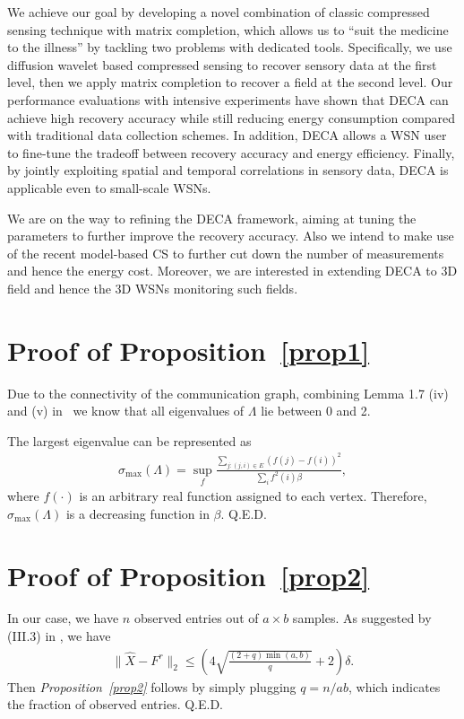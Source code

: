 \documentclass[conference]{IEEEtran}
\begin{document}
  We achieve our goal by developing a novel combination of classic compressed sensing technique with matrix completion, which allows us to ``suit the medicine to the illness'' by tackling two problems with dedicated tools. Specifically, we use diffusion wavelet based compressed sensing to recover sensory data at the first level, then we apply matrix completion to recover a field at the second level. Our performance evaluations with intensive experiments have shown that DECA can achieve high recovery accuracy while still reducing energy consumption compared with traditional data collection schemes. In addition, DECA allows a WSN user to fine-tune the tradeoff between recovery accuracy and energy efficiency. Finally, by jointly exploiting spatial and temporal correlations in sensory data, DECA is applicable even to small-scale WSNs.

  We are on the way to refining the DECA framework, aiming at tuning the parameters to further improve the recovery accuracy. Also we intend to make use of the recent model-based CS to further cut down the number of measurements and hence the energy cost. Moreover, we are interested in extending DECA to 3D field and hence the 3D WSNs monitoring such fields.





\appendices
\section{Proof of Proposition~\ref{prop1}} \label{apx:prop1}

Due to the connectivity of the communication graph, combining Lemma 1.7 (iv) and (v) in~\cite{Chung97} we know that all eigenvalues of $\Lambda$ lie between 0 and 2.

The largest eigenvalue can be represented as
\begin{eqnarray*}
\sigma_\mathrm{max}(\Lambda) = \sup_f \frac{\sum_{j:(j,i)\in E}(f(j)-f(i))^2}{\sum_i f^2(i)\beta},
\end{eqnarray*}
where $f(\cdot)$ is an arbitrary real function assigned to each vertex. Therefore, $\sigma_\mathrm{max}(\Lambda)$ is a decreasing function in $\beta$. \hfill Q.E.D.

\section{Proof of Proposition~\ref{prop2}} \label{apx:prop2}

In our case, we have $n$ observed entries out of $a\times b$ samples. As suggested by (III.3) in \cite{CandesP-ProcIEEE10}, we have
\begin{eqnarray*}
\|\hat{X} - F^r\|_2 \le \left(4\sqrt{\frac{(2+q)\min(a,b)}{q}} + 2\right)\delta.
\end{eqnarray*}
Then \textit{Proposition~\ref{prop2}} follows by simply plugging $q=n/ab$, which indicates the fraction of observed entries. \hfill Q.E.D.
\end{document}
